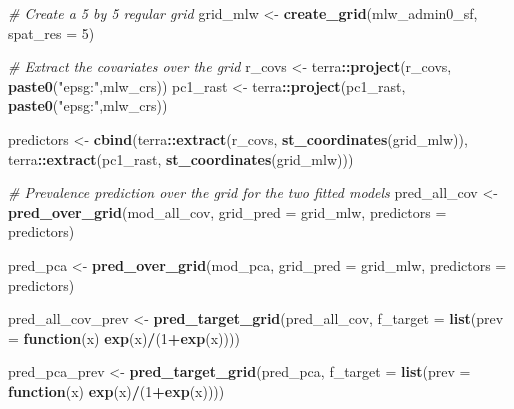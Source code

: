 \documentclass[
  letterpaper,
]{krantz}
\newenvironment{Shaded}{\begin{snugshade}}{\end{snugshade}}
\newcommand{\AttributeTok}[1]{\textcolor[rgb]{0.13,0.29,0.53}{#1}}
\newcommand{\CommentTok}[1]{\textcolor[rgb]{0.56,0.35,0.01}{\textit{#1}}}
\newcommand{\ControlFlowTok}[1]{\textcolor[rgb]{0.13,0.29,0.53}{\textbf{#1}}}
\newcommand{\DecValTok}[1]{\textcolor[rgb]{0.00,0.00,0.81}{#1}}
\newcommand{\FunctionTok}[1]{\textcolor[rgb]{0.13,0.29,0.53}{\textbf{#1}}}
\newcommand{\NormalTok}[1]{#1}
\newcommand{\OtherTok}[1]{\textcolor[rgb]{0.56,0.35,0.01}{#1}}
\newcommand{\SpecialCharTok}[1]{\textcolor[rgb]{0.81,0.36,0.00}{\textbf{#1}}}
\newcommand{\StringTok}[1]{\textcolor[rgb]{0.31,0.60,0.02}{#1}}
\begin{document}
\begin{Shaded}
\begin{Highlighting}[]
\CommentTok{\# Create a 5 by 5 regular grid }
\NormalTok{grid\_mlw }\OtherTok{\textless{}{-}} \FunctionTok{create\_grid}\NormalTok{(mlw\_admin0\_sf, }\AttributeTok{spat\_res =} \DecValTok{5}\NormalTok{)}

\CommentTok{\# Extract the covariates over the grid}
\NormalTok{r\_covs }\OtherTok{\textless{}{-}}\NormalTok{ terra}\SpecialCharTok{::}\FunctionTok{project}\NormalTok{(r\_covs, }\FunctionTok{paste0}\NormalTok{(}\StringTok{"epsg:"}\NormalTok{,mlw\_crs))}
\NormalTok{pc1\_rast }\OtherTok{\textless{}{-}}\NormalTok{ terra}\SpecialCharTok{::}\FunctionTok{project}\NormalTok{(pc1\_rast, }\FunctionTok{paste0}\NormalTok{(}\StringTok{"epsg:"}\NormalTok{,mlw\_crs))}

\NormalTok{predictors }\OtherTok{\textless{}{-}} \FunctionTok{cbind}\NormalTok{(terra}\SpecialCharTok{::}\FunctionTok{extract}\NormalTok{(r\_covs,  }\FunctionTok{st\_coordinates}\NormalTok{(grid\_mlw)),}
\NormalTok{                    terra}\SpecialCharTok{::}\FunctionTok{extract}\NormalTok{(pc1\_rast,  }\FunctionTok{st\_coordinates}\NormalTok{(grid\_mlw)))}

\CommentTok{\# Prevalence prediction over the grid for the two fitted models }
\NormalTok{pred\_all\_cov }\OtherTok{\textless{}{-}} \FunctionTok{pred\_over\_grid}\NormalTok{(mod\_all\_cov,}
                               \AttributeTok{grid\_pred =}\NormalTok{ grid\_mlw,}
                               \AttributeTok{predictors =}\NormalTok{ predictors)}

\NormalTok{pred\_pca }\OtherTok{\textless{}{-}} \FunctionTok{pred\_over\_grid}\NormalTok{(mod\_pca,}
                           \AttributeTok{grid\_pred =}\NormalTok{ grid\_mlw,}
                           \AttributeTok{predictors =}\NormalTok{ predictors)}

\NormalTok{pred\_all\_cov\_prev }\OtherTok{\textless{}{-}} \FunctionTok{pred\_target\_grid}\NormalTok{(pred\_all\_cov,}
                                      \AttributeTok{f\_target =} \FunctionTok{list}\NormalTok{(}\AttributeTok{prev =} \ControlFlowTok{function}\NormalTok{(x) }\FunctionTok{exp}\NormalTok{(x)}\SpecialCharTok{/}\NormalTok{(}\DecValTok{1}\SpecialCharTok{+}\FunctionTok{exp}\NormalTok{(x))))}

\NormalTok{pred\_pca\_prev }\OtherTok{\textless{}{-}} \FunctionTok{pred\_target\_grid}\NormalTok{(pred\_pca,}
                             \AttributeTok{f\_target =} \FunctionTok{list}\NormalTok{(}\AttributeTok{prev =} \ControlFlowTok{function}\NormalTok{(x) }\FunctionTok{exp}\NormalTok{(x)}\SpecialCharTok{/}\NormalTok{(}\DecValTok{1}\SpecialCharTok{+}\FunctionTok{exp}\NormalTok{(x))))}
\end{Highlighting}
\end{Shaded}
\end{document}
